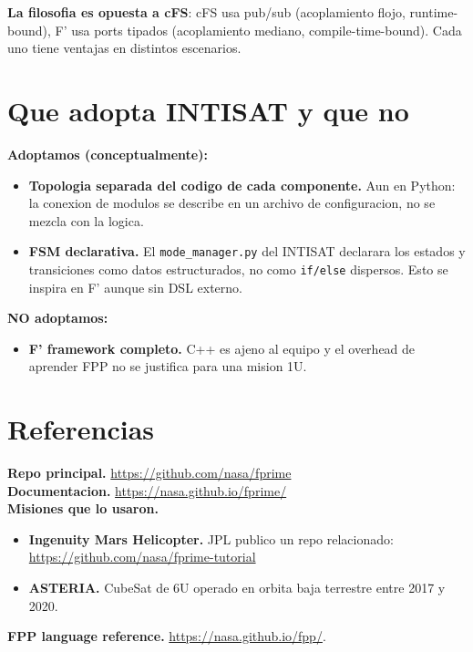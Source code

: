 \documentclass[11pt,a4paper,oneside,openright]{book}
\begin{document}
\textbf{La filosofia es opuesta a cFS}: cFS usa pub/sub (acoplamiento
flojo, runtime-bound), F' usa ports tipados (acoplamiento mediano,
compile-time-bound). Cada uno tiene ventajas en distintos escenarios.

\section{Que adopta INTISAT y que no}

\begin{logrado}
\textbf{Adoptamos (conceptualmente):}
\begin{itemize}[leftmargin=2em]
  \item \textbf{Topologia separada del codigo de cada componente.}
    Aun en Python: la conexion de modulos se describe en un archivo
    de configuracion, no se mezcla con la logica.
  \item \textbf{FSM declarativa.} El \texttt{mode\_manager.py} del
    INTISAT declarara los estados y transiciones como datos
    estructurados, no como \texttt{if/else} dispersos. Esto se
    inspira en F' aunque sin DSL externo.
\end{itemize}

\textbf{NO adoptamos:}
\begin{itemize}[leftmargin=2em]
  \item \textbf{F' framework completo.} C++ es ajeno al equipo y
    el overhead de aprender FPP no se justifica para una mision 1U.
\end{itemize}
\end{logrado}

\section{Referencias}

\begin{payloadbox}
\textbf{Repo principal.} \url{https://github.com/nasa/fprime}\\[0.3em]
\textbf{Documentacion.} \url{https://nasa.github.io/fprime/}\\[0.3em]
\textbf{Misiones que lo usaron.}
\begin{itemize}[leftmargin=2em]
  \item \textbf{Ingenuity Mars Helicopter.} JPL publico un repo
    relacionado: \url{https://github.com/nasa/fprime-tutorial}
  \item \textbf{ASTERIA.} CubeSat de 6U operado en orbita baja
    terrestre entre 2017 y 2020.
\end{itemize}
\textbf{FPP language reference.}
\url{https://nasa.github.io/fpp/}.
\end{payloadbox}
\end{document}
